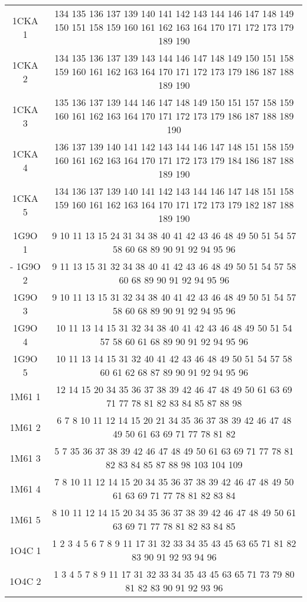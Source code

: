\begin{table}[!htbp]
{\begin{tabular}{cc}
        1CKA 1 & 134 135 136 137 139 140 141 142 143 144 146 147 148 149 150 151 158 159 160 161 162 163 164 170 171 172 173 179 189 190 \\
        1CKA 2 & 134 135 136 137 139 143 144 146 147 148 149 150 151 158 159 160 161 162 163 164 170 171 172 173 179 186 187 188 189 190 \\
        1CKA 3 & 135 136 137 139 144 146 147 148 149 150 151 157 158 159 160 161 162 163 164 170 171 172 173 179 186 187 188 189 190 \\
        1CKA 4 & 136 137 139 140 141 142 143 144 146 147 148 151 158 159 160 161 162 163 164 170 171 172 173 179 184 186 187 188 189 190 \\
        1CKA 5 & 134 136 137 139 140 141 142 143 144 146 147 148 151 158 159 160 161 162 163 164 170 171 172 173 179 182 187 188 189 190 \\
        1G9O 1 & 9 10 11 13 15 24 31 34 38 40 41 42 43 46 48 49 50 51 54 57 58 60 68 89 90 91 92 94 95 96 \\
-       1G9O 2 & 9 11 13 15 31 32 34 38 40 41 42 43 46 48 49 50 51 54 57 58 60 68 89 90 91 92 94 95 96 \\
        1G9O 3 & 9 10 11 13 15 31 32 34 38 40 41 42 43 46 48 49 50 51 54 57 58 60 68 89 90 91 92 94 95 96 \\
        1G9O 4 & 10 11 13 14 15 31 32 34 38 40 41 42 43 46 48 49 50 51 54 57 58 60 61 68 89 90 91 92 94 95 96 \\
        1G9O 5 & 10 11 13 14 15 31 32 40 41 42 43 46 48 49 50 51 54 57 58 60 61 62 68 87 89 90 91 92 94 95 96 \\
        1M61 1 & 12 14 15 20 34 35 36 37 38 39 42 46 47 48 49 50 61 63 69 71 77 78 81 82 83 84 85 87 88 98 \\
        1M61 2 & 6 7 8 10 11 12 14 15 20 21 34 35 36 37 38 39 42 46 47 48 49 50 61 63 69 71 77 78 81 82 \\
        1M61 3 & 5 7 35 36 37 38 39 42 46 47 48 49 50 61 63 69 71 77 78 81 82 83 84 85 87 88 98 103 104 109 \\
        1M61 4 & 7 8 10 11 12 14 15 20 34 35 36 37 38 39 42 46 47 48 49 50 61 63 69 71 77 78 81 82 83 84 \\
        1M61 5 & 8 10 11 12 14 15 20 34 35 36 37 38 39 42 46 47 48 49 50 61 63 69 71 77 78 81 82 83 84 85 \\
        1O4C 1 & 1 2 3 4 5 6 7 8 9 11 17 31 32 33 34 35 43 45 63 65 71 81 82 83 90 91 92 93 94 96\\
        1O4C 2 & 1 3 4 5 7 8 9 11 17 31 32 33 34 35 43 45 63 65 71 73 79 80 81 82 83 90 91 92 93 96\\

\end{tabular}}
\end{table}
